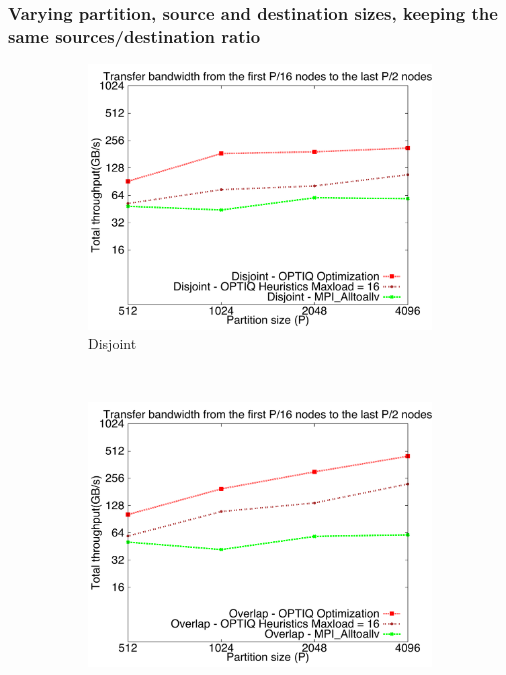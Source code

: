 \subsubsection{Varying partition, source and destination sizes, keeping the same sources/destination ratio}

\begin{figure}[!htbp]
        \centering
        \begin{subfigure}[b]{0.32\textwidth}
                \includegraphics[width=\textwidth]{figures/constantr_3.pdf}
                \caption{Disjoint}
                \label{fig:constantr_3}
        \end{subfigure}%
        ~ %
        \begin{subfigure}[b]{0.32\textwidth}
                \includegraphics[width=\textwidth]{figures/constantr_27}

\end{subfigure}
\end{figure}
